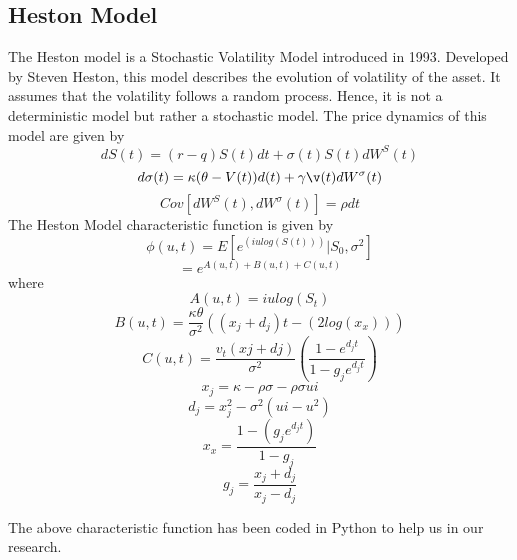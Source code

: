 \documentclass{article}
\begin{document}
\subsection{Heston Model}
The Heston model is a Stochastic Volatility Model introduced in 1993. Developed by Steven Heston, this model describes the evolution of volatility of the asset. It assumes that the volatility follows a random process. Hence, it is not a deterministic model but rather a stochastic model.
The price dynamics of this model are given by
\begin{equation}
dS(t) = (r- q)S(t)dt + \sigma(t)S(t)dW^S(t)
\end{equation}
\begin{equation}
d\sigma(t) = \kappa(\theta-V(t))d(t) + \gamma\v(t)dW^\sigma(t)
\end{equation}
\begin{equation}
Cov[dW^S(t), dW^\sigma(t)] = \rho dt
\end{equation}
The Heston Model characteristic function is given by
\begin{equation}
    \phi(u,t) = E[e^{(iulog(S(t)))}|S_{0}, \sigma^2]
\end{equation}
\begin{equation}
    = e^{A(u,t)+B(u,t)+C(u,t)}
\end{equation}
where
\begin{equation}
    A(u,t) = iulog(S_t)
\end{equation}
\begin{equation}
    B(u,t) = \frac{\kappa\theta}{\sigma^2}((x_j+d_j)t - (2log(x_x)) )
\end{equation}
\begin{equation}
    C(u,t) = \frac{v_t(xj+dj)}{\sigma^2} (\frac{1-e^{d_j t}}{ 1-g_je^{d_j t}})
\end{equation}
\begin{equation}
    x_j = \kappa-\rho\sigma-\rho\sigma ui
\end{equation}
\begin{equation}
    d_j = x_{j}^2 - \sigma^2(ui - u^2)
\end{equation}
\begin{equation}
    x_x = \frac{ 1-(g_j e^{d_j t})}{ 1-g_j}
\end{equation}
\begin{equation}
    g_j = \frac{x_j + d_j}{x_j - d_j}
\end{equation}

The above characteristic function has been coded in Python to help us in our research.
\end{document}
